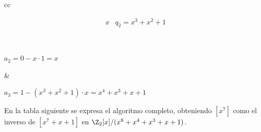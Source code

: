 \begin{ejs}
\begin{center}
\begin{tabular}{cc}
\begin{minipage}[t]{0.48\textwidth}
\[\begin{array}{rl|l}
                            &x &  q_2 = x^3 + x^2 + 1
                        \end{array}
                    \]
                \end{minipage}\\
                \hspace{-3em}
                \begin{minipage}[t]{0.45\textwidth}
                    \vspace{0.5em}
                    \centering
                    $a_2 =  0 - x\cdot 1 = x$
                \end{minipage}
                \hspace{-0.5em}
                &
                \begin{minipage}[t]{0.48\textwidth}
                    \vspace{0.35em}
                    \centering
                    $a_3 = 1 - (x^3 + x^2 + 1)\cdot x = x^4 + x^3 + x + 1$
                \end{minipage}
            \end{tabular}
        \end{center}
        
        En la tabla siguiente se expresa el algoritmo completo, obteniendo $[x^7]$ como el inverso de $[x^7 + x + 1]$ en $\Z_2[x]/(x^8 + x^4 + x^3 + x + 1)$.
      

\end{ejs}
